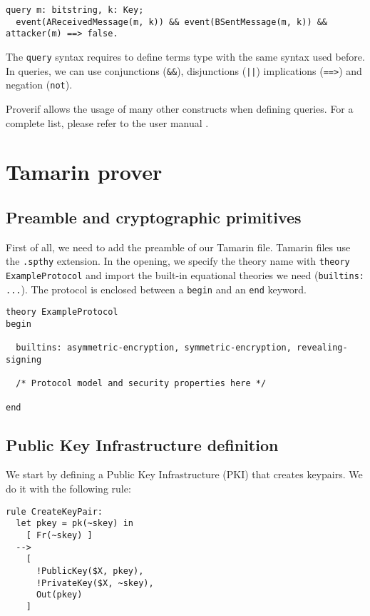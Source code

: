 \begin{lstlisting}
query m: bitstring, k: Key;
  event(AReceivedMessage(m, k)) && event(BSentMessage(m, k)) && attacker(m) ==> false.
\end{lstlisting}

The \lstinline{query} syntax requires to define terms type with the same syntax used before. In queries, we can use conjunctions (\lstinline{&&}), disjunctions (\lstinline{||}) implications (\lstinline{==>}) and negation (\lstinline{not}).

Proverif allows the usage of many other constructs when defining queries. For a complete list, please refer to the user manual \cite{ProverifManual}.

\lstset{language=tamarin}
\section{Tamarin prover}

\subsection{Preamble and cryptographic primitives}

First of all, we need to add the preamble of our Tamarin file. Tamarin files use the \lstinline{.spthy} extension. In the opening, we specify the theory name with \lstinline{theory ExampleProtocol} and import the built-in equational theories we need (\lstinline{builtins: ...}). The protocol is enclosed between a \lstinline{begin} and an \lstinline{end} keyword.

\begin{lstlisting}
theory ExampleProtocol
begin

  builtins: asymmetric-encryption, symmetric-encryption, revealing-signing

  /* Protocol model and security properties here */

end
\end{lstlisting}

\subsection{Public Key Infrastructure definition}
\label{subsec:tamarin-example-protocol-model}

We start by defining a Public Key Infrastructure (PKI) that creates keypairs. We do it with the following rule:

\begin{lstlisting}
rule CreateKeyPair:
  let pkey = pk(~skey) in
    [ Fr(~skey) ]
  -->
    [
      !PublicKey($X, pkey),
      !PrivateKey($X, ~skey),
      Out(pkey)
    ]
\end{lstlisting}

